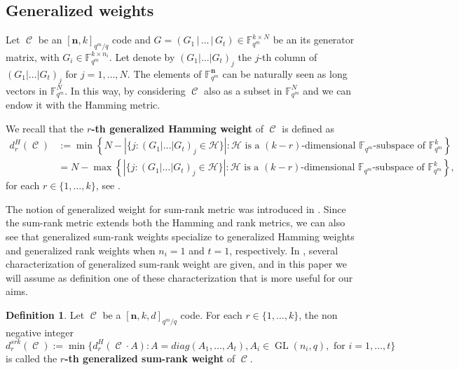 \documentclass[11pt]{amsart}
\DeclareMathOperator{\C}{\mathcal{C}}
\DeclareMathOperator{\GL}{GL}
\theoremstyle{definition}
\newtheorem{definition}[theorem]{Definition}
\newcommand{\F}{{\mathbb F}}
\newcommand{\bfn}{\mathbf {n}}
\newcommand{\Fm}{{\mathbb F}_{q^m}}
\newcommand{\Fmnk}{[\bfn,k]_{q^m/q}}
\newcommand{\Fmnkd}{[\bfn,k,d]_{q^m/q}}
\begin{document}
\subsection{Generalized weights}
Let $\C$ be an $\Fmnk$ code and $G=(G_1 \,|\, \ldots \,|\, G_t)\in \F_{q^m}^{k \times N}$ be an its generator matrix, with $G_i \in \Fm^{k \times n_i}$. Let denote by $(G_1 | \ldots  | G_t)_{j}$ the $j$-th column of $(G_1 | \ldots  | G_t)_{j}$ for $j=1,\ldots,N$. The elements of $\F_{q^m}^{\bfn}$ can be naturally seen as long vectors in $\F_{q^m}^N$. In this way, by considering $\C$ also as a subset in $\F_{q^m}^N$ and we can endow it with the Hamming metric. 

We recall that the \textbf{$r$-th generalized Hamming weight} of $\C$ is  defined as 
\begin{equation} \label{eq:generalizedhamming}
\begin{array}{rl} 
d_r^H(\C) & :=\min \left\{N- \left\lvert \{j: (G_1 | \ldots  | G_t)_{j} \in \mathcal{H} \}  \right\rvert \colon  \mathcal{H} \mbox{ is a } (k-r)\mbox{-dimensional } \F_{q^m}\mbox{-subspace of } \F_{q^m}^k \right\} \\
& = N- \max \left\{\left\lvert \{j: (G_1 | \ldots  | G_t)_{j} \in \mathcal{H} \}  \right\rvert \colon  \mathcal{H} \mbox{ is a } (k-r)\mbox{-dimensional } \F_{q^m}\mbox{-subspace of } \F_{q^m}^k \right\},
\end{array}
\end{equation}
for each $r \in \{1,\ldots,k\}$, see
\cite[Theorem 1.1.14]{vladut2007algebraic}.

The notion of generalized weight for sum-rank metric was introduced in \cite{martinez2019theory}.
Since the sum-rank metric extends both the Hamming and rank metrics, we can also see that generalized sum-rank weights specialize to
generalized Hamming weights \cite{helleseth1977weight,luo2005some,wei1991generalized} and generalized rank weights \cite{kurihara2015relative,oggier2012existence} when $n_i = 1$
and $t = 1$, respectively.
In \cite[Section 4]{martinez2019theory}, several characterization of generalized sum-rank weight are given, and in this paper we will assume as definition one of these characterization \cite[Proposition 4]{martinez2019theory} that is more useful for our aims.

\begin{definition}
Let $\C$ be a $\Fmnkd$ code. For each $r \in \{1,\ldots,k \}$, the non negative integer
\[
d_r^{srk}(\C):= \min \{d^H_r(\C \cdot A) \colon A=diag(A_1,\ldots,A_t), A_i \in \GL(n_i,q), \mbox{ for } i=1,\ldots,t  \} 
\]
is called the \textbf{$r$-th generalized sum-rank weight} of $\C$.
\end{definition}
\end{document}
